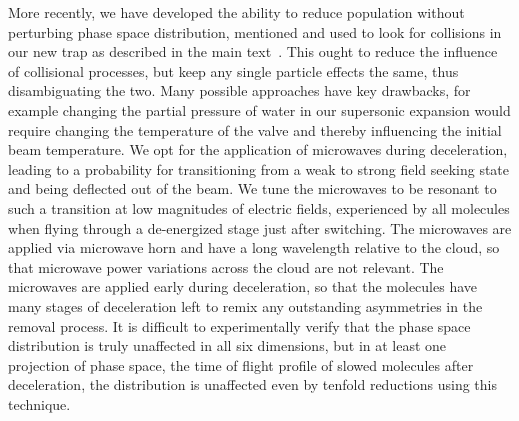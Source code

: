\documentclass[%
 reprint,
 amsmath,amssymb,
 aps,
pra,
]{revtex4-1}
\begin{document}
More recently, we have developed the ability to reduce population without perturbing phase space distribution, mentioned and used to look for collisions in our new trap as described in the main text~\cite{smt}.
This ought to reduce the influence of collisional processes, but keep any single particle effects the same, thus disambiguating the two.
Many possible approaches have key drawbacks, for example changing the partial pressure of water in our supersonic expansion would require changing the temperature of the valve and thereby influencing the initial beam temperature.
We opt for the application of microwaves during deceleration, leading to a probability for transitioning from a weak to strong field seeking state and being deflected out of the beam.
We tune the microwaves to be resonant to such a transition at low magnitudes of electric fields, experienced by all molecules when flying through a de-energized stage just after switching.
The microwaves are applied via microwave horn and have a long wavelength relative to the cloud, so that microwave power variations across the cloud are not relevant.
The microwaves are applied early during deceleration, so that the molecules have many stages of deceleration left to remix any outstanding asymmetries in the removal process.
It is difficult to experimentally verify that the phase space distribution is truly unaffected in all six dimensions, but in at least one projection of phase space, the time of flight profile of slowed molecules after deceleration, the distribution is unaffected even by tenfold reductions using this technique.

\end{document}
